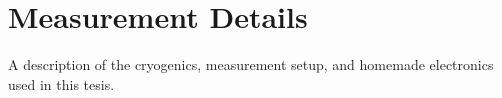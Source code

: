 
\chapter{Measurement Details}
\label{sec:measurement}

A description of the cryogenics, measurement setup, and homemade electronics used in this tesis.